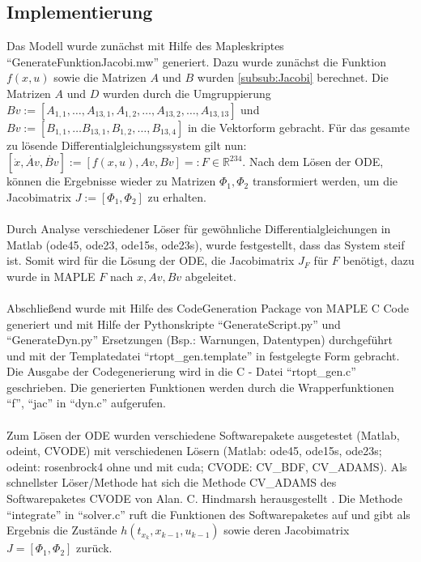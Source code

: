 \subsection{Implementierung}
Das Modell wurde zunächst mit Hilfe des Mapleskriptes ``GenerateFunktionJacobi.mw'' generiert. Dazu wurde zunächst die Funktion $f(x, u)$ sowie die Matrizen $A$ und $B$ wurden \ref{subsub:Jacobi} berechnet.  Die Matrizen $A$ und $D$ wurden durch die Umgruppierung $Bv:=[A_{1, 1}, \dotso, A_{13, 1}, A_{1, 2}, \dotso, A_{13, 2}, \dotso, A_{13, 13}]$ und $Bv:=[B_{1, 1}, \dotso B_{13, 1}, B_{1, 2}, \dotso, B_{13, 4}]$ in die Vektorform gebracht. Für das gesamte zu lösende Differentialgleichungssystem gilt nun: $[\dot{x}, \dot{Av}, \dot{Bv}]:=[f(x, u), Av, Bv] =: F \in \mathbb{R}^{234}$. Nach dem Lösen der ODE, können die Ergebnisse wieder zu Matrizen $\Phi_1, \Phi_2$ transformiert werden, um die Jacobimatrix $J:=[\Phi_1, \Phi_2]$ zu erhalten.\\
\\ 
Durch Analyse verschiedener Löser für gewöhnliche Differentialgleichungen in Matlab (ode45, ode23, ode15s, ode23s), wurde festgestellt, dass das System steif ist. Somit wird für die Lösung der ODE, die Jacobimatrix $J_F$ für $F$ benötigt, dazu wurde in MAPLE $F$ nach $x, Av, Bv$ abgeleitet. \\
\\
Abschließend wurde mit Hilfe des CodeGeneration Package von MAPLE C Code generiert und mit Hilfe der Pythonskripte ``GenerateScript.py'' und ``GenerateDyn.py'' Ersetzungen (Bsp.: Warnungen, Datentypen) durchgeführt und mit der Templatedatei ``rtopt\_gen.template'' in festgelegte Form gebracht. Die Ausgabe der Codegenerierung wird in die C - Datei ``rtopt\_gen.c'' geschrieben. Die generierten Funktionen werden durch die Wrapperfunktionen ``f'', ``jac'' in ``dyn.c'' aufgerufen. \\
\\
Zum Lösen der ODE wurden verschiedene Softwarepakete ausgetestet (Matlab, odeint, CVODE) mit verschiedenen Lösern (Matlab: ode45, ode15s, ode23s; odeint: rosenbrock4 ohne und mit cuda; CVODE: CV\_BDF, CV\_ADAMS). Als schnellster Löser/Methode hat sich die Methode CV\_ADAMS des Softwarepaketes CVODE von Alan. C. Hindmarsh herausgestellt \cite{Hindmarsh2015}. Die Methode ``integrate'' in ``solver.c'' ruft die Funktionen des Softwarepaketes auf und gibt als Ergebnis die Zustände $h(t_{x_k}, x_{k-1}, u_{k-1})$ sowie deren Jacobimatrix $J=[\Phi_1, \Phi_2]$ zurück.
